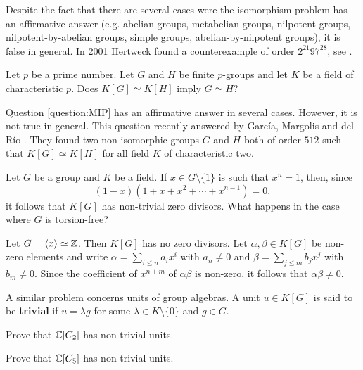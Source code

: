 Despite the fact that there are several cases were 
the isomorphism problem has an affirmative answer (e.g. abelian groups, 
metabelian groups, nilpotent groups, nilpotent-by-abelian groups, simple groups, 
abelian-by-nilpotent groups), it is false in general. In 2001  
Hertweck found a counterexample of order $2^{21}97^{28}$, see \cite{MR1847590}.  

\begin{question}
\label{question:MIP}
    Let $p$ be a prime number. Let 
    $G$ and $H$ be finite $p$-groups and let $K$ be a field of characteristic $p$. 
    Does $K[G]\simeq K[H]$ imply $G\simeq H$?
\end{question}   

Question \ref{question:MIP} has an affirmative answer in several cases. However, 
it is not true in general. This question recently answered by Garc\'ia, Margolis and
del R\'io \cite{MR4373245}. They found two non-isomorphic groups $G$ and $H$ both of order $512$ 
such that $K[G]\simeq K[H]$ for all field $K$ 
of characteristic two. 


Let $G$ be a group and $K$ be a field. If  
$x\in G\setminus\{1\}$ is such that $x^n=1$, then, since 
\[
(1-x)(1+x+x^2+\cdots+x^{n-1})=0, 
\] 
it follows that $K[G]$ has non-trivial zero divisors. What happens in the case
where $G$ is torsion-free?

\begin{example}
	\label{example:k[Z]}
	Let $G=\langle x\rangle\simeq\mathbb{Z}$. Then $K[G]$ has no zero divisors. 
	Let $\alpha,\beta\in K[G]$ be non-zero elements and write 
	$\alpha=\sum_{i\leq n}a_ix^i$ with $a_n\ne 0$ and $\beta=\sum_{j\leq m}b_jx^j$
	with $b_m\ne 0$. Since the coefficient of $x^{n+m}$ of $\alpha\beta$ is non-zero,
	it follows that 
	$\alpha\beta\ne 0$.
\end{example}

A similar problem concerns units of group algebras.  A unit $u\in K[G]$ is said
to be \textbf{trivial} if $u=\lambda g$ for some $\lambda\in K\setminus\{0\}$ and
$g\in G$.	

\begin{exercise}
\label{xca:non_trivial:C2}
	Prove that $\mathbb{C}[C_2]$ has non-trivial units.
\end{exercise}

\begin{exercise}
\label{xca:non_trivial:C5}
	Prove that $\mathbb{C}[C_5]$ has non-trivial units. 
\end{exercise}

